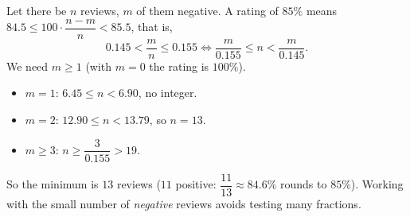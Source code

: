 Let there be $n$ reviews, $m$ of them negative. A rating of $85\%$ means $84.5\le100\cdot\dfrac{n-m}{n}<85.5$, that is,
\[
0.145<\dfrac {m}{n}\le0.155\iff \dfrac{m}{0.155}\le n<\dfrac{m}{0.145}.
\]
We need $m\ge1$ (with $m=0$ the rating is $100\%$).
\begin{itemize}
\item $m=1$: $6.45\le n<6.90$, no integer.
\item $m=2$: $12.90\le n<13.79$, so $n=13$.
\item $m\ge3$: $n\ge\dfrac{3}{0.155}>19$.
\end{itemize}
So the minimum is $\boxed{13}$ reviews ($11$ positive: $\dfrac{11}{13}\approx84.6\%$ rounds to $85\%$). Working with the small number of \emph{negative} reviews avoids testing many fractions.
